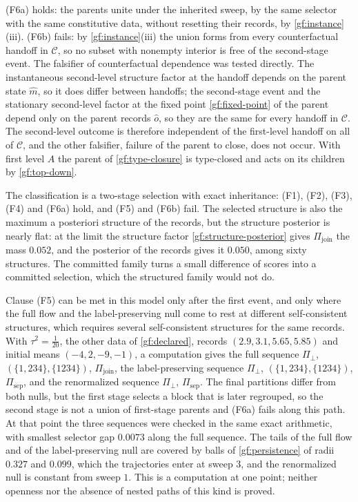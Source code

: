 (F6a) holds: the parents unite under the inherited sweep, by the same
selector with the same constitutive data, without resetting their records,
by \cref{gf:instance}(iii). (F6b) fails: by \cref{gf:instance}(iii) the union
forms from every counterfactual handoff in $\mathcal C$, so no subset with
nonempty interior is free of the second-stage event. The falsifier of
counterfactual dependence was tested directly. The instantaneous
second-level structure factor at the handoff depends on the parent state
$\hat m$, so it does differ between handoffs; the second-stage event and the
stationary second-level factor at the fixed point \cref{gf:fixed-point} of
the parent depend only on the parent records $\hat o$, so they are the same
for every handoff in $\mathcal C$. The second-level outcome is therefore
independent of the first-level handoff on all of $\mathcal C$, and the other
falsifier, failure of the parent to close, does not occur. With first level
$A$ the parent of \cref{gf:type-closure} is type-closed and acts on its
children by \cref{gf:top-down}.

The classification is a two-stage selection with exact inheritance: (F1),
(F2), (F3), (F4) and (F6a) hold, and (F5) and (F6b) fail. The selected
structure is also the maximum a posteriori structure of the records, but the
structure posterior is nearly flat: at the limit the structure factor
\cref{gf:structure-posterior} gives $\Pi_{\mathrm{join}}$ the mass $0.052$, and
the posterior of the records gives it $0.050$, among sixty structures. The
committed family turns a small difference of scores into a committed
selection, which the structured family would not do.

Clause (F5) can be met in this model only after the first event, and only
where the full flow and the label-preserving null come to rest at different
self-consistent structures, which requires several self-consistent structures
for the same records. With $\tau^2=\tfrac1{20}$, the other data of
\cref{gf:declared}, records $(2.9,3.1,5.65,5.85)$ and initial means
$(-4,2,-9,-1)$, a computation gives the full sequence $\Pi_\perp$,
$(\{1,234\},\{1234\})$, $\Pi_{\mathrm{join}}$, the label-preserving sequence
$\Pi_\perp$, $(\{1,234\},\{1234\})$, $\Pi_{\mathrm{sep}}$, and the renormalized
sequence $\Pi_\perp$, $\Pi_{\mathrm{sep}}$. The final partitions differ from
both nulls, but the first stage selects a block that is later regrouped, so
the second stage is not a union of first-stage parents and (F6a) fails along
this path. At that point the three sequences were checked in the same exact
arithmetic, with smallest selector gap $0.0073$ along the full sequence. The
tails of the full flow and of the label-preserving null are covered by balls
of \cref{gf:persistence} of radii $0.327$ and $0.099$, which the trajectories
enter at sweep $3$, and the renormalized null is constant from sweep $1$.
This is a computation at one point; neither openness nor the
absence of nested paths of this kind is proved.

